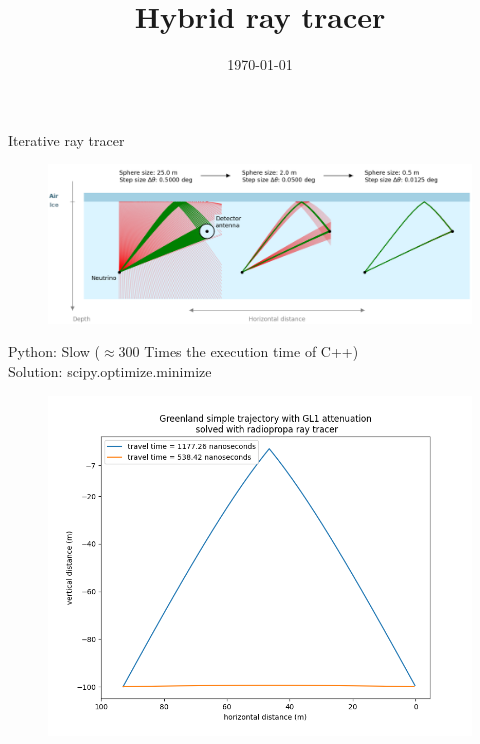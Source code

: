 \documentclass{beamer}
\title{Hybrid ray tracer}
\date{\today}
\begin{document}
\begin{frame}
	\titlepage
\end{frame}
\begin{frame}
	Iterative ray tracer
	\begin{figure}
		\includegraphics[width=\textwidth]{figures/iterative_explanation.png}
	\end{figure}
\end{frame}
\begin{frame}
	Python: Slow ($\approx 300$ Times the execution time of C++)\\
	Solution: scipy.optimize.minimize
\end{frame}
\begin{frame}
	\begin{figure}
		\includegraphics[width=\textwidth]{figures/iterative.png}
	\end{figure}
\end{frame}
\end{document}
